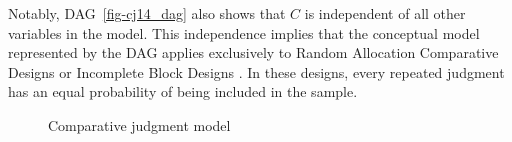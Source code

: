 \documentclass[
  authoryear,
  review,
  1p]{elsarticle}
\begin{document}
Notably, DAG~\ref{fig-cj14_dag} also shows that \(C\) is independent of
all other variables in the model. This independence implies that the
conceptual model represented by the DAG applies exclusively to Random
Allocation Comparative Designs \citep{Bramley_2015} or Incomplete Block
Designs \citep{Lawson_2015}. In these designs, every repeated judgment
has an equal probability of being included in the sample.

\begin{figure}[H]

\begin{minipage}{\linewidth}

\centering{

\[
\begin{aligned}
  O_{R} & := f_{O}(D_{R}, S, C) \\
  D_{R} & := f_{D}(T_{IA}, B_{JK}) \\
  T_{IA} & := f_{T}(T_{I}, X_{IA}, e_{IA}) \\
  T_{I} & := f_{T}(X_{I}, e_{I}) \\
  B_{JK} & := f_{B}(B_{J}, Z_{JK}, e_{JK}) \\
  B_{J} & := f_{B}(Z_{J}, e_{J}) \\
  e_{I} & \:\bot\:\{ e_{J}, e_{IA}, e_{JK} \} \\
  e_{J} & \:\bot\:\{ e_{IA}, e_{JK} \} \\
  e_{IA} & \:\bot\:e_{JK} 
\end{aligned}
\]

}


\end{minipage}%
\newline
\begin{minipage}{\linewidth}



\end{minipage}%

\caption{\label{fig-cj15}Comparative judgment model}

\end{figure}%
\end{document}
